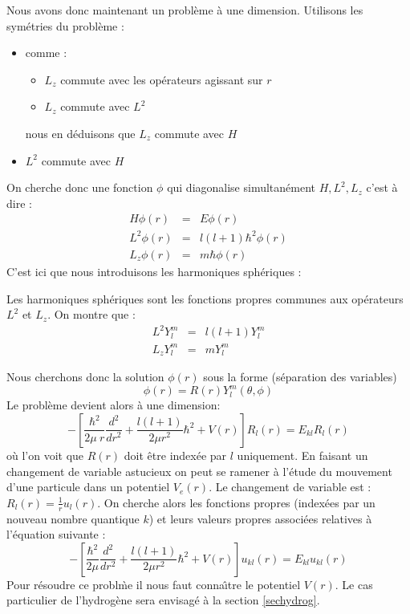 \documentclass[12pt]{book}
\begin{document}
Nous avons donc maintenant un probl\`eme \`a une dimension. Utilisons les
sym\'etries du probl\`eme :
\begin{itemize}
\item comme :
      \begin{itemize}
       \item $L_z$ commute avec les op\'erateurs agissant sur $r$
       \item $L_z$ commute avec $L^2$
      \end{itemize}
nous en d\'eduisons que $L_z$ commute avec $H$
\item $L^2$ commute avec $H$
\end{itemize}
On cherche donc une fonction $\phi$ qui diagonalise simultan\'ement
$H,L^2,L_z$ c'est \`a dire : 
\begin{eqnarray}
H\phi(r)&=&E\phi(r)\\
L^2\phi(r)&=&l(l+1)\hbar^2\phi(r)\\
L_z\phi(r)&=&m\hbar\phi(r)
\end{eqnarray}
C'est ici que nous introduisons les harmoniques sph\'eriques :
\begin{defn}
Les harmoniques sph\'eriques sont les fonctions propres communes aux
op\'erateurs $L^2$ et $L_z$. On montre que :
\begin{eqnarray}
L^2Y^m_l&=&l(l+1)Y^m_l\\
L_zY^m_l&=&mY^m_l
\end{eqnarray}
\end{defn}
Nous cherchons donc la solution $\phi(r)$ sous la forme (s\'eparation
des variables)
\begin{equation}
\phi(r)=R(r)Y^m_l(\theta,\phi)
\end{equation}
Le probl\`eme devient alors \`a une dimension:
\begin{equation}
-[\frac{\hbar^2}{2\mu\ r}\frac{d^2}{dr^2}+\frac{l(l+1)}{2\mu r^2}\hbar^2+V(r)]R_{l}(r)=E_{kl}R_{l}(r)
\end{equation}
o\`u l'on voit que $R(r)$ doit \^etre index\'ee par $l$ uniquement.
En faisant un changement de variable astucieux on
peut se ramener \`a l'\'etude du mouvement d'une particule dans un
potentiel $V_e(r)$.
Le changement de variable est :$R_{l}(r)=\frac{1}{r}u_{l}(r) $.
On cherche alors les fonctions propres (index\'ees par un nouveau
nombre quantique $k$) et leurs valeurs propres associ\'ees relatives
\`a l'\'equation suivante :
\begin{equation}
-[\frac{\hbar^2}{2\mu}\frac{d^2}{dr^2}+\frac{l(l+1)}{2\mu r^2}\hbar^2+V(r)]u_{kl}(r)=E_{kl}u_{kl}(r)
\end{equation}
Pour r\'esoudre ce probl\`me il nous faut conna\^\i tre le potentiel
$V(r)$. Le cas particulier de l'hydrog\`ene sera envisag\'e \`a la
section \ref{sechydrog}.
\end{document}
